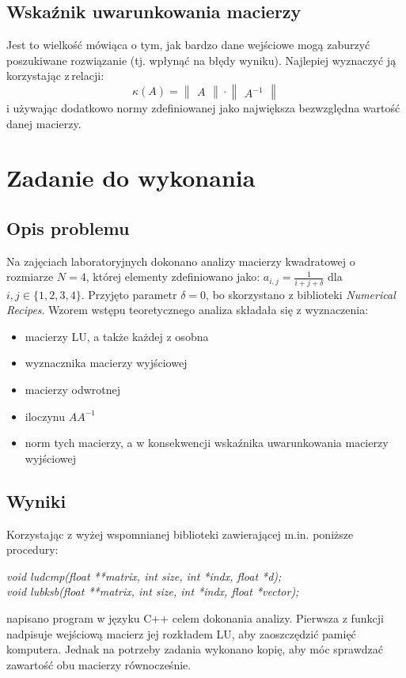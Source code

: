 \subsection{Wskaźnik uwarunkowania macierzy}
Jest to wielkość mówiąca o tym, jak bardzo dane wejściowe mogą zaburzyć poszukiwane rozwiązanie (tj. wpłynąć na błędy wyniku). Najlepiej wyznaczyć ją korzystając z\,relacji:
\begin{equation}
\kappa(A)= \begin{Vmatrix} A \end{Vmatrix} \cdot \begin{Vmatrix} A^{-1} \end{Vmatrix}
\end{equation}
i używając dodatkowo normy zdefiniowanej jako największa bezwzględna wartość danej macierzy.
 
\section{Zadanie do wykonania}

\subsection{Opis problemu}

Na zajęciach laboratoryjnych dokonano analizy macierzy kwadratowej o rozmiarze $N = 4$, której elementy zdefiniowano jako: $a_{i,j} = \frac{1}{i + j + \delta}$ dla $i,j \in \{1, 2, 3, 4\}$. Przyjęto parametr $\delta = 0$, bo skorzystano z biblioteki \textit{Numerical Recipes}. Wzorem wstępu teoretycznego analiza składała się z wyznaczenia:
\begin{itemize}
	\item macierzy LU, a także każdej z osobna
	\item wyznacznika macierzy wyjściowej 
	\item macierzy odwrotnej
	\item iloczynu $ AA^{-1} $
	\item norm tych macierzy, a w konsekwencji wskaźnika uwarunkowania macierzy\,wyjściowej
\end{itemize}

\subsection{Wyniki}

Korzystając z wyżej wspomnianej biblioteki zawierającej m.in. poniższe procedury:
\begin{center}
	\textit{
void ludcmp(float **matrix, int size, int *indx, float *d); \\
void lubksb(float **matrix, int size, int *indx, float *vector); }
\end{center}
napisano program w języku C++ celem dokonania analizy. Pierwsza z funkcji nadpisuje wejściową macierz jej rozkładem LU, aby zaoszczędzić pamięć komputera. Jednak na potrzeby zadania wykonano kopię, aby móc sprawdzać zawartość obu macierzy równocześnie. 

